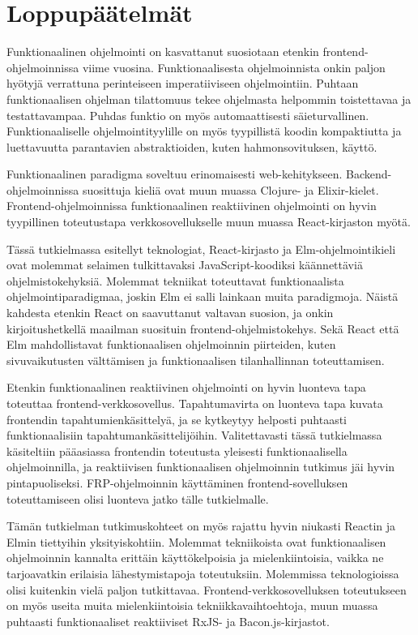 \chapter{Loppupäätelmät}
Funktionaalinen ohjelmointi on kasvattanut suosiotaan etenkin frontend-ohjelmoin\-nis\-sa viime vuosina.
Funktionaalisesta ohjelmoinnista onkin paljon hyötyjä verrattuna perinteiseen imperatiiviseen ohjelmointiin. Puhtaan
funktionaalisen ohjelman tilattomuus tekee ohjelmasta helpommin toistettavaa ja testattavampaa. Puhdas funktio on myös
automaattisesti säieturvallinen. Funktionaaliselle ohjelmointityylille on myös tyypillistä koodin kompaktiutta ja
luettavuutta parantavien abstraktioiden, kuten hahmonsovituksen, käyttö.

Funktionaalinen paradigma soveltuu erinomaisesti web-kehitykseen. Backend-ohjelmoinnissa suosittuja kieliä ovat muun
muassa Clojure- ja Elixir-kielet. Frontend-ohjelmoinnissa funktionaalinen reaktiivinen ohjelmointi on hyvin tyypillinen
toteutustapa verkkosovellukselle muun muassa React-kirjaston myötä.

Tässä tutkielmassa esitellyt teknologiat, React-kirjasto ja Elm-ohjelmointikieli ovat molemmat selaimen tulkittavaksi
JavaScript-koodiksi käännettäviä ohjelmistokehyksiä. Molemmat tekniikat toteuttavat funktionaalista
ohjelmointiparadigmaa, joskin Elm ei salli lainkaan muita paradigmoja. Näistä kahdesta etenkin React on saavuttanut
valtavan suosion, ja onkin kirjoitushetkellä maailman suosituin frontend-ohjelmistokehys. Sekä React että Elm
mahdollistavat funktionaalisen ohjelmoinnin piirteiden, kuten sivuvaikutusten välttämisen ja funktionaalisen
tilanhallinnan toteuttamisen.

Etenkin funktionaalinen reaktiivinen ohjelmointi on hyvin luonteva tapa toteuttaa frontend-verkkosovellus.
Tapahtumavirta on luonteva tapa kuvata frontendin tapahtumienkäsittelyä, ja se kytkeytyy helposti puhtaasti
funktionaalisiin tapahtumankäsittelijöihin. Valitettavasti tässä tutkielmassa käsiteltiin pääasiassa frontendin
toteutusta yleisesti funktionaalisella ohjelmoinnilla, ja reaktiivisen funktionaalisen ohjelmoinnin tutkimus jäi hyvin
pintapuoliseksi. FRP-ohjelmoinnin käyttäminen frontend-sovelluksen toteuttamiseen olisi luonteva jatko tälle
tutkielmalle.

Tämän tutkielman tutkimuskohteet on myös rajattu hyvin niukasti Reactin ja Elmin tiettyihin yksityiskohtiin. Molemmat
tekniikoista ovat funktionaalisen ohjelmoinnin kannalta erittäin käyttökelpoisia ja mielenkiintoisia, vaikka ne
tarjoavatkin erilaisia lähestymistapoja toteutuksiin. Molemmissa teknologioissa olisi kuitenkin vielä paljon
tutkittavaa. Frontend-verkkosovelluksen toteutukseen on myös useita muita mielenkiintoisia tekniikkavaihtoehtoja, muun
muassa puhtaasti funktionaaliset reaktiiviset RxJS- ja Bacon.js-kirjastot.
